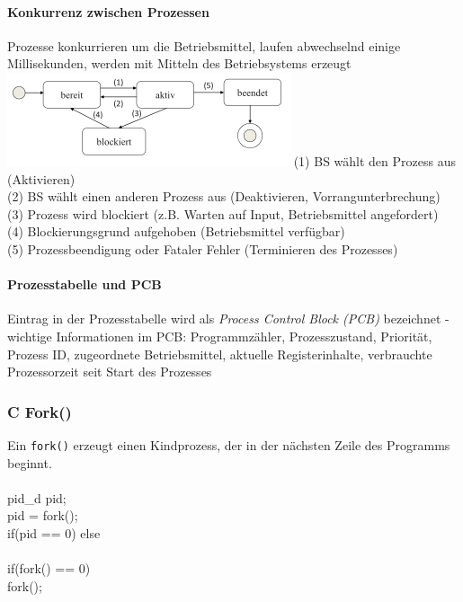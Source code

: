 \documentclass[11pt,a4paper,landscape]{article}
\newenvironment{allesInCode}{\ttfamily}{\par}
\begin{document}
\begin{multicols*}{3}
	\paragraph{Konkurrenz zwischen Prozessen} Prozesse konkurrieren um die Betriebsmittel, laufen abwechselnd einige Millisekunden, werden mit Mitteln des Betriebsystems erzeugt
	\includegraphics[width=1\columnwidth]{prozesse}
	(1) BS wählt den Prozess aus (Aktivieren)\\
	(2) BS wählt einen anderen Prozess aus (Deaktivieren, Vorrangunterbrechung)\\
	(3) Prozess wird blockiert (z.B. Warten auf Input, Betriebsmittel angefordert)\\
	(4) Blockierungsgrund aufgehoben (Betriebsmittel verfügbar)\\
	(5) Prozessbeendigung oder Fataler Fehler (Terminieren des Prozesses)\\
	\paragraph{Prozesstabelle und PCB} Eintrag in der Prozesstabelle wird als \textit{Process Control Block (PCB)} bezeichnet - wichtige Informationen im PCB: Programmzähler, Prozesszustand, Priorität, Prozess ID, zugeordnete Betriebsmittel, aktuelle Registerinhalte, verbrauchte Prozessorzeit seit Start des Prozesses
	\subsubsection{C Fork()}
	Ein \texttt{fork()} erzeugt einen Kindprozess, der in der nächsten Zeile des Programms beginnt.\\\\
	\begin{allesInCode}
		pid\_d pid; \\
		pid = fork(); \\
		if(pid == 0)  else  \\\\
		if(fork() == 0)  \\
		fork(); \\
	\end{allesInCode}

\end{multicols*}
\end{document}
